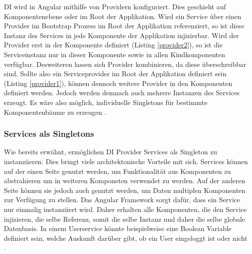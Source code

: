 \ac{DI} wird in Angular mithilfe von Providern konfiguriert.
Dies geschieht auf Komponentenebene oder im Root der Applikation.
Wird ein Service über einen Provider im Bootstrap Prozess im Root der Applikation referenziert,
so ist diese Instanz des Services in jede Komponente der Applikation injizierbar.
Wird der Provider erst in der Komponente definiert (Listing \ref{provider2}), so ist die Serviceinstanz nur in dieser Komponente sowie in
allen Kindkomponenten verfügbar. Desweiteren lassen sich Provider kombinieren, da diese überschreibbar sind.
Sollte also ein Serviceprovider im Root der Applikation definiert sein (Listing \ref{provider1}), können dennoch weitere Provider in den Komponenten definiert werden.
Jedoch werden demnach auch mehrere Instanzen des Services erzeugt.
Es wäre also möglich, individuelle Singletons für bestimmte Komponentenbäume zu erzeugen \cite[286]{Angular2}.

\vspace{0.2cm}

\vspace{0.2cm}

\vspace{0.2cm}

\vspace{0.2cm}


\subsubsection{Services als Singletons}
\label{Services-als-Singletons}

Wie bereits erwähnt, ermöglichen \ac{DI} Provider Services als Singleton zu instanziieren.
Dies bringt viele architektonische Vorteile mit sich. Services können auf der einen Seite genutzt werden,
um Funktionalität aus Komponenten zu abstrahieren um in weiteren Komponeten verwendet zu werden.
Auf der anderen Seite können sie jedoch auch genutzt werden, um Daten multiplen Komponenten zur Verfügung zu stellen.
Das Angular Framework sorgt dafür, dass ein Service nur einmalig instanziiert wird. Daher erhalten alle
Komponenten, die den Service injizieren, die selbe Referenz, somit die selbe Instanz und daher die selbe globale Datenbasis.
In einem Userservice könnte beispielweise eine Boolean Variable definiert sein, welche Auskunft darüber gibt,
ob ein User eingeloggt ist oder nicht \cite[308]{Angular2}.



